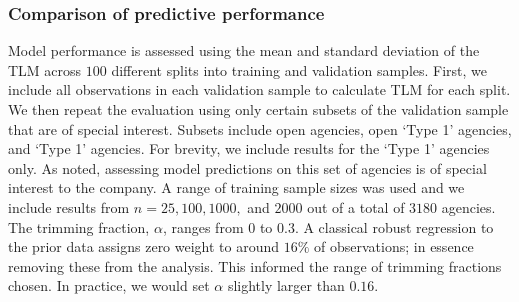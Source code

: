 \documentclass[12pt]{article}
\begin{document}
\subsubsection{Comparison of predictive performance}
Model performance is assessed
using the mean and standard deviation of the TLM 
across $100$ different splits into training and validation samples. First, we include all observations
in each validation sample to calculate TLM for each split. We then
repeat the evaluation using only certain subsets of the validation
sample that are of special interest. Subsets include open agencies,
open `Type 1' agencies, and `Type 1' agencies. For brevity, we include
results for the `Type 1' agencies only. As noted, assessing model
predictions on this set of agencies is of special interest to the
company.  A range of training sample sizes was used and we include
results from $n=25,100,1000,$ and $2000$ out of a total of $3180$ agencies. The trimming fraction, $\alpha$, ranges from $0$ to $0.3$. A classical robust regression to the prior data assigns zero weight to around $16\%$ of observations; in essence removing these from the analysis. This informed the range of trimming fractions chosen.  
In practice, we would set $\alpha$ slightly larger than $0.16$.  
\end{document}

